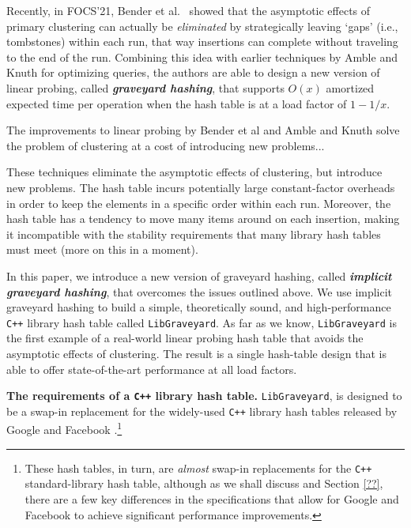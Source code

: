 \documentclass[10pt]{article}
\theoremstyle{remark}
\theoremstyle{remark}
\newcommand{\defn}[1]{\textbf{\emph{#1}}}
\renewcommand{\paragraph}[1]{\vspace{.2 cm} \noindent \textbf{#1}}
\newcommand{\propose}[1]{{\color{navyblue}#1}}
\begin{document}


Recently, in FOCS'21, Bender et al.~\cite{?} showed that the asymptotic effects of primary clustering can actually be \emph{eliminated} by strategically leaving `gaps' (i.e., tombstones) within each run, that way insertions can complete without traveling to the end of the run. Combining this idea with earlier techniques by Amble and Knuth \cite{??} for optimizing queries, the authors are able to design a new version of linear probing, called \defn{graveyard hashing}, that supports $O(x)$ amortized expected time per operation when the hash table is at a load factor of $1 - 1/x$.

\propose{The improvements to linear probing by Bender et al and Amble and Knuth solve the problem of clustering at a cost of introducing new problems...}


These techniques \cite{BenderKuKu22, AmbleKn74} eliminate the asymptotic effects of clustering, but introduce new problems. The hash table incurs potentially large constant-factor overheads in order to keep the elements in a specific order within each run. Moreover, the hash table has a tendency to move many items around on each insertion, making it incompatible with the stability requirements that many library hash tables \cite{??, ??, ??} must meet (more on this in a moment). 

In this paper, we introduce a new version of graveyard hashing, called \defn{implicit graveyard hashing}, that overcomes the issues outlined above. We use implicit graveyard hashing to build a simple, theoretically sound, and high-performance \texttt{C++} library hash table called \texttt{LibGraveyard}. As far as we know, \texttt{LibGraveyard} is the first example of a real-world linear probing hash table that avoids the asymptotic effects of clustering. The result is a single hash-table design that is able to offer state-of-the-art performance at all load factors.

\paragraph{The requirements of a \texttt{C++} library hash table.} \texttt{LibGraveyard}, is designed to be a swap-in replacement for the widely-used \texttt{C++} library hash tables released by Google \cite{?} and Facebook \cite{?}.\footnote{These hash tables, in turn, are \emph{almost} swap-in replacements for the \texttt{C++} standard-library hash table, although as we shall discuss and Section \ref{??}, there are a few key differences in the specifications that allow for Google and Facebook to achieve significant performance improvements.} 
\end{document}
